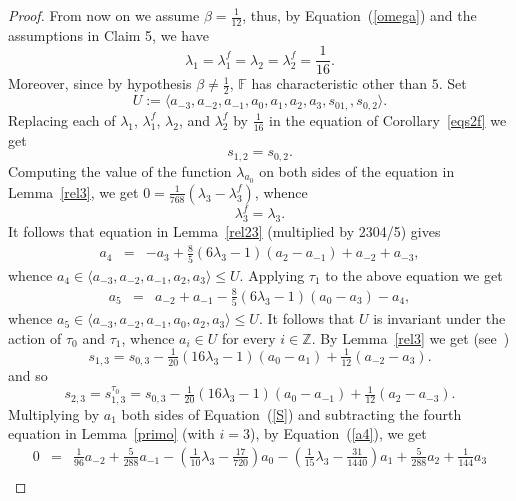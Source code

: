 \documentclass[a4paper]{amsart}
\newcommand{\F}{{\mathbb F}}
\newcommand{\Z}{{\mathbb Z}}
\newcommand{\lm}{\lambda}
\newcommand{\lmu}{\lambda_1}
\newcommand{\lmf}{\lambda_1^f}
\newcommand{\lmd}{\lambda_2}
\newcommand{\lmdf}{\lambda_2^f}
\newcommand{\lmt}{\lambda_3}
\newcommand{\bt}{\beta}
\begin{document}
\begin{proof}
From now on we assume $\bt=\tfrac{1}{12}$, thus, by Equation~(\ref{omega}) and the assumptions in Claim 5, we have
$$
\lmu=\lmf=\lmd=\lmdf=\frac{1}{16}.
$$
Moreover, since by hypothesis $\bt\neq \tfrac{1}{2}$, $\F$ has characteristic other than $5$. Set
$$
U:=\langle a_{-3}, a_{-2}, a_{-1}, a_0, a_1, a_2, a_3, s_{01,}, s_{0,2}\rangle . 
$$
Replacing each of $\lmu$, $\lmf$, $\lmd$, and $\lmdf$ by $\frac{1}{16}$ in the equation of Corollary~\ref{eqs2f} we get
$$
s_{1,2}=s_{0,2}.
$$
Computing the value of the function $\lambda_{a_0}$ on both sides of the equation in Lemma~\ref{rel3}, we get $0=\frac{1}{768}(\lmt-\lmt^f)$,  whence 
$$
\lmt^f=\lmt.
$$ 
It follows that
equation in Lemma~\ref{rel23} (multiplied by 2304/5) gives
\begin{eqnarray} \label{a4}%
a_4&=&-a_3+\tfrac{8}{5}(6\lmt-1)(a_2-a_{-1})+a_{-2}+a_{-3},
\end{eqnarray}
whence $a_4\in \langle a_{-3}, a_{-2}, a_{-1}, a_2, a_3\rangle\leq U$.
Applying $\tau_1$ to the above equation we get
\begin{eqnarray*} \label{a5}%
a_5&=&a_{-2}+a_{-1}-\tfrac{8}{5}(6\lmt-1)(a_0-a_{3})-a_{4},
\end{eqnarray*}
whence $a_{5}\in \langle a_{-3}, a_{-2}, a_{-1}, a_0, a_2, a_3\rangle \leq U$. It follows that  $U$ is invariant under the action of $\tau_0$ and $\tau_1$, whence $a_i\in U$ for every $i\in \Z$. 
By Lemma~\ref{rel3} we get (see~\cite[genericsakuma-4bt.s]{code})
\begin{equation}\label{S}
s_{1,3}=s_{0,3}-\tfrac{1}{20}(16\lmt-1)(a_0-a_1)+\tfrac{1}{12}(a_{-2}-a_3).
\end{equation}
and so
\begin{equation}\label{S2}
s_{2,3}=s_{1,3}^{\tau_0}=s_{0,3}-\tfrac{1}{20}(16\lmt-1)(a_0-a_{-1})+\tfrac{1}{12}(a_2-a_{-3}).
\end{equation}
Multiplying by $a_1$ both sides of Equation~(\ref{S}) and subtracting the fourth equation in Lemma~\ref{primo} (with $i=3$), by Equation~(\ref{a4}), we get
\begin{eqnarray}\label{Relnew}
0&=&\tfrac{1}{96}a_{-2}+\tfrac{5}{288}a_{-1}-(\tfrac{1}{10}\lmt -\tfrac{17}{720})a_0-(\tfrac{1}{15}\lmt -\tfrac{31}{1440})a_1+\tfrac{5}{288}a_2+\tfrac{1}{144}a_3 \nonumber\\

\end{eqnarray}
\end{proof}
\end{document}
